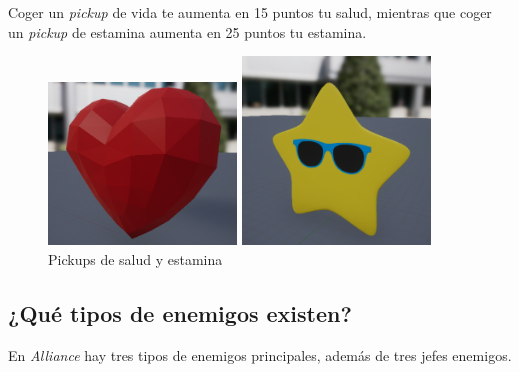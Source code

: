 \begin{itemize}
Coger un \textit{pickup} de vida te aumenta en 15 puntos tu salud, mientras que coger un \textit{pickup} de estamina aumenta en 25 puntos tu estamina.


\begin{figure}[H]
  \begin{minipage}{0.5\textwidth}
    \centering
    \includegraphics[width=5cm]{./images/Health.png}
  \end{minipage}%
  \hspace{1mm}
  \begin{minipage}{0.5\textwidth}
    \centering
    \includegraphics[width=5cm]{./images/Stamina.png}
  \end{minipage}
  \caption{Pickups de salud y estamina}
  \label{Pickup}
\end{figure}
\end{itemize}

\subsection{¿Qué tipos de enemigos existen?}

En \textit{Alliance} hay tres tipos de enemigos principales, además de tres jefes enemigos.

